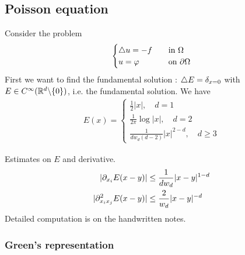 \documentclass[12pt,a4paper]{article}
\newenvironment{proof}
{\begin{changemargin}{0.5cm}{0.5cm} 
	}%
	{\end{changemargin}
}
\begin{document}
\subsection*{Poisson equation}

Consider the problem
\begin{align*}
\begin{cases}
\triangle u = -f\quad &\text{in } \Omega\\
u = \varphi \quad &\text{on } \partial \Omega
\end{cases}
\end{align*}
First we want to find the fundamental solution : $\triangle E =\delta_{x=0}$ with $E\in C^{\infty} (\mathbb{R}^d \backslash \{0\})$, i.e. the fundamental solution. We have
\begin{align*}
E(x) = \begin{cases}
\frac{1}{2} |x|, \quad d=1\\
\frac{1}{2\pi} \log |x|, \quad d=2\\
\frac{1}{dw_d (d-2)}|x|^{2-d}, \quad d\geq 3
\end{cases}
\end{align*}

\begin{proof}
\pf Estimates on $E$ and derivative.
\begin{align*}
|\partial_{x_i} E(x-y) | &\leq \frac{1}{dw_d} |x-y|^{1-d}\\
|\partial_{x_i x_j}^2 E(x-y) |&\leq \frac{2}{w_d} |x-y|^{-d}
\end{align*}
Detailed computation is on the handwritten notes.
\end{proof}
\s

\subsubsection*{Green's representation}
\end{document}
